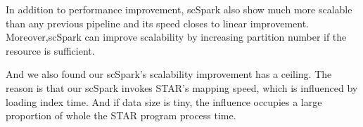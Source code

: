 \documentclass[10pt,journal,compsoc]{IEEEtran}
\begin{document}
In addition to performance improvement, scSpark also show much more scalable than any previous pipeline and its speed closes to linear improvement.
Moreover,scSpark can improve scalability by increasing partition number if the resource is sufficient.

And we also found our scSpark's scalability improvement has a ceiling. 
The reason is that our scSpark invokes STAR's mapping speed, which is influenced by loading index time. 
And if data size is tiny, the influence occupies a large proportion of whole the STAR program process time. 

\ifCLASSOPTIONcaptionsoff
  \newpage
\fi





\end{document}
